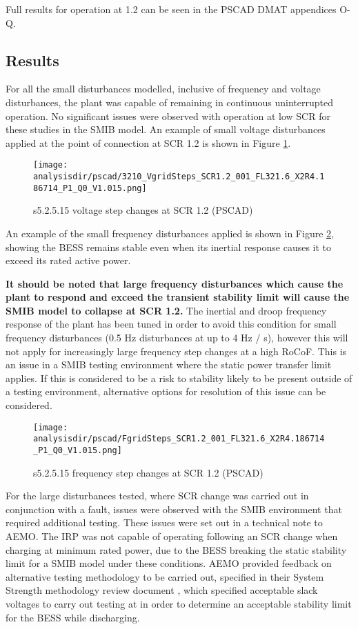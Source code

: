 \documentclass{../grid-link-report}
\newcommand{\analysisdir}{report-assets/analysis}
\begin{document}
	Full results for operation at 1.2 can be seen in the PSCAD DMAT appendices O-Q.

	\subsection{Results}
	For all the small disturbances modelled, inclusive of frequency and voltage disturbances, the plant was capable of remaining in continuous uninterrupted operation. No significant issues were observed with operation at low SCR for these studies in the SMIB model. An example of small voltage disturbances applied at the point of connection at SCR 1.2 is shown in Figure \ref{fig:52515-voltage-steps}.
	
	\begin{figure}[H]
		\centering
		\texttt{[image: \\analysisdir/pscad/3210\_VgridSteps\_SCR1.2\_001\_FL321.6\_X2R4.186714\_P1\_Q0\_V1.015.png]}
		\caption{s5.2.5.15 voltage step changes at SCR 1.2 (PSCAD)}
		\label{fig:52515-voltage-steps}
	\end{figure}
	
	An example of the small frequency disturbances applied is shown in Figure \ref{fig:52515-frequency-steps}, showing the BESS remains stable even when its inertial response causes it to exceed its rated active power. 
	
	\textbf{It should be noted that large frequency disturbances which cause the plant to respond and exceed the transient stability limit will cause the SMIB model to collapse at SCR 1.2.} The inertial and droop frequency response of the plant has been tuned in order to avoid this condition for small frequency disturbances (0.5 Hz disturbances at up to 4 Hz / s), however this will not apply for increasingly large frequency step changes at a high RoCoF. This is an issue in a SMIB testing environment where the static power transfer limit applies. If this is considered to be a risk to stability likely to be present outside of a testing environment, alternative options for resolution of this issue can be considered.
	
	\begin{figure}[H]
		\centering
		\texttt{[image: \\analysisdir/pscad/FgridSteps\_SCR1.2\_001\_FL321.6\_X2R4.186714\_P1\_Q0\_V1.015.png]}
		\caption{s5.2.5.15 frequency step changes at SCR 1.2 (PSCAD)}
		\label{fig:52515-frequency-steps}
	\end{figure}
	
	For the large disturbances tested, where SCR change was carried out in conjunction with a fault, issues were observed with the SMIB environment that required additional testing. These issues were set out in a technical note to AEMO. \cite{scr-change-tech-memo} The \ac{IRP} was not capable of operating following an SCR change when charging at minimum rated power, due to the BESS breaking the static stability limit for a SMIB model under these conditions. AEMO provided feedback on alternative testing methodology to be carried out, specified in their System Strength methodology review document \cite{system-strength-methodology-review}, which specified acceptable slack voltages to carry out testing at in order to determine an acceptable stability limit for the BESS while discharging.
	
\end{document}
